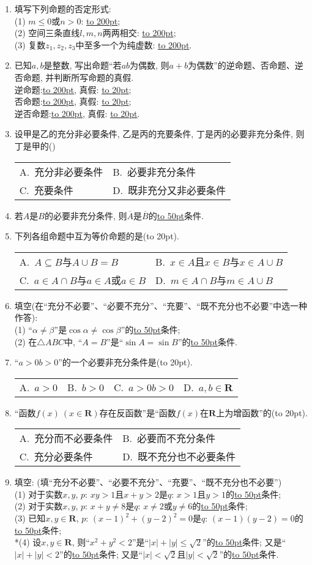 \documentclass[10pt,a4paper]{article}
\newcommand{\blank}[1]{\underline{\hbox to #1pt{}}}
\newcommand{\bracket}[1]{(\hbox to #1pt{})}
\newcommand{\twoch}[4]{\par\begin{tabular}{p{.46\textwidth}p{.46\textwidth}}
A.~#1& B.~#2\\
C.~#3& D.~#4
\end{tabular}}
\newcommand{\fourch}[4]{\par\begin{tabular}{p{.23\textwidth}p{.23\textwidth}p{.23\textwidth}p{.23\textwidth}}
A.~#1 &B.~#2& C.~#3& D.~#4
\end{tabular}}
\begin{document}
\begin{enumerate}[1.]
\item 填写下列命题的否定形式:\\
(1) $m\le 0$或$n>0$: \blank{200};\\
(2) 空间三条直线$l,m,n$两两相交: \blank{200};\\
(3) 复数$z_1,z_2,z_3$中至多一个为纯虚数: \blank{200}.
\item 已知$a,b$是整数, 写出命题``若$ab$为偶数, 则$a+b$为偶数''的逆命题、否命题、逆否命题, 并判断所写命题的真假.\\
逆命题:\blank{200}, 真假: \blank{20};\\
否命题:\blank{200}, 真假: \blank{20};\\
逆否命题:\blank{200}, 真假: \blank{20}.
\item 设甲是乙的充分非必要条件, 乙是丙的充要条件, 丁是丙的必要非充分条件, 则丁是甲的() 
\twoch{充分非必要条件}{必要非充分条件}{充要条件}{既非充分又非必要条件}
\item 若$A$是$B$的必要非充分条件, 则$\overline{A}$是$\overline{B}$的\blank{50}条件.  
\item 下列各组命题中互为等价命题的是\bracket{20}.
\twoch{$A\subseteq B$与$A\cup B=B$}{$x\in A$且$x\in B$与$x\in A\cup B$}{$a\in A\cap B$与$a\in A$或$a\in B$}{$m\in A\cap B$与$m\in A\cup B$}
\item 填空(在``充分不必要''、``必要不充分''、``充要''、``既不充分也不必要''中选一种作答):\\
(1) ``$\alpha \ne \beta$''是$\cos \alpha \ne \cos \beta$''的\blank{50}条件;\\
(2) 在$\triangle ABC$中, ``$A=B$''是``$\sin A=\sin B$''的\blank{50}条件.
\item ``$a>0b>0$''的一个必要非充分条件是\bracket{20}.
\fourch{$a>0$}{$b>0$}{$a>0b>0$}{$a,b\in \mathbf{R}$}
\item ``函数$f(x)\ (x\in \mathbf{R})$存在反函数''是``函数$f(x)$在$\mathbf{R}$上为增函数''的\bracket{20}.
\twoch{充分而不必要条件}{必要而不充分条件}{充分必要条件}{既不充分也不必要条件}
\item 填空: (填``充分不必要''、``必要不充分''、``充要''、``既不充分也不必要'')\\ 
(1) 对于实数$x,y$, $p$: $xy>1$且$x+y>2$是$q$: $x>1$且$y>1$的\blank{50}条件;\\
(2) 对于实数$x,y$, $p$: $x+y\ne 8$是$q$: $x\ne 2$或$y\ne 6$的\blank{50}条件;\\
(3) 已知$x,y\in \mathbf{R}$, $p$: $(x-1)^2+(y-2)^2=0$是$q$: $(x-1)(y-2)=0$的\blank{50}条件;\\
*(4) 设$x,y\in \mathbf{R}$, 则``$x^2+y^2<2$''是``$|x|+|y|\le \sqrt2$''的\blank{50}条件; 又是``$|x|+|y|<2$''的\blank{50}条件; 又是``$|x|<\sqrt2$且$|y|<\sqrt2$''的\blank{50}条件.\\

\end{enumerate}
\end{document}
